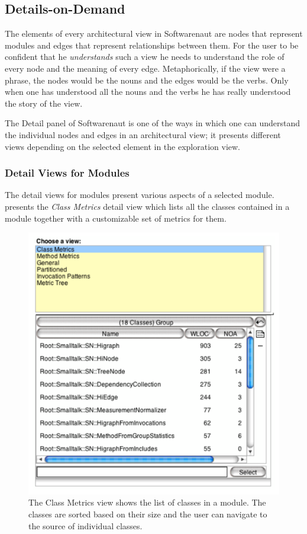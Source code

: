 \documentclass[preprint,12pt]{elsarticle}
\begin{document}
\subsection {Details-on-Demand} 

The elements of every architectural view in Softwarenaut are nodes that represent modules and edges that represent relationships between them. For the user to be confident that he {\em understands} such a view he needs to understand the role of every node and the meaning of every edge. Metaphorically, if the view were a phrase, the nodes would be the nouns and the edges would be the verbs. Only when one has understood all the nouns and the verbs he has really understood the story of the view.  

The Detail panel of Softwarenaut is one of the ways in which one can understand the individual nodes and edges in an architectural view; it presents different views depending on the selected element in the exploration view. 

\subsubsection {Detail Views for Modules}

The detail views for modules present various aspects of a selected module.  presents the {\em Class Metrics} detail view which lists all the classes contained in a module together with a customizable set of metrics for them.

\begin{figure}[ht]
\begin{center}
\includegraphics[width=0.5\linewidth]{DetailForNode}
\caption{The Class Metrics view shows the list of classes in a module. The classes are sorted based on their size and the user can navigate to the source of individual classes.}
\end{center}
\end{figure}
\end{document}
